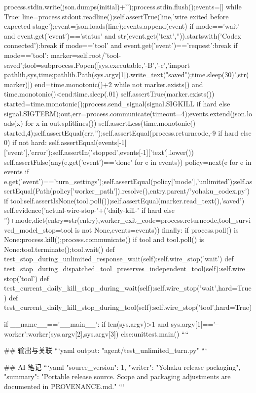    process.stdin.write(json.dumps(initial)+'\n');process.stdin.flush();events=[]
   while True:
    line=process.stdout.readline();self.assertTrue(line,'wire exited before expected stage');event=json.loads(line);events.append(event)
    if mode=='wait' and event.get('event')=='status' and str(event.get('text','')).startswith('Codex connected'):break
    if mode=='tool' and event.get('event')=='request':break
   if mode=='tool':
    marker=self.root/'tool-saved';tool=subprocess.Popen([sys.executable,'-B','-c','import pathlib,sys,time;pathlib.Path(sys.argv[1]).write_text("saved");time.sleep(30)',str(marker)])
    end=time.monotonic()+2
    while not marker.exists() and time.monotonic()<end:time.sleep(.01)
    self.assertTrue(marker.exists())
   started=time.monotonic();process.send_signal(signal.SIGKILL if hard else signal.SIGTERM);out,err=process.communicate(timeout=4);events.extend(json.loads(x) for x in out.splitlines())
   self.assertLess(time.monotonic()-started,4);self.assertEqual(err,'');self.assertEqual(process.returncode,-9 if hard else 0)
   if not hard:
    self.assertEqual(events[-1]['event'],'error');self.assertIn('stopped',events[-1]['text'].lower())
   self.assertFalse(any(e.get('event')=='done' for e in events))
   policy=next(e for e in events if e.get('event')=='turn_settings');self.assertEqual(policy['mode'],'unlimited');self.assertEqual(Path(policy['worker_path']).resolve(),entry.parent/'yohaku_codex.py')
   if tool:self.assertIsNone(tool.poll());self.assertEqual(marker.read_text(),'saved')
   self.evidence('actual-wire-stop-'+('daily-kill-' if hard else '')+mode,dict(entry=str(entry),worker_exit_code=process.returncode,tool_survived_model_stop=tool is not None,events=events))
  finally:
   if process.poll() is None:process.kill();process.communicate()
   if tool and tool.poll() is None:tool.terminate();tool.wait()
 def test_stop_during_unlimited_response_wait(self):self.wire_stop('wait')
 def test_stop_during_dispatched_tool_preserves_independent_tool(self):self.wire_stop('tool')
 def test_current_daily_kill_stop_during_wait(self):self.wire_stop('wait',hard=True)
 def test_current_daily_kill_stop_during_tool(self):self.wire_stop('tool',hard=True)

if __name__=='__main__':
 if len(sys.argv)>1 and sys.argv[1]=='--worker':worker(sys.argv[2],sys.argv[3])
 else:unittest.main()
````

## 输出与关联
```yaml
output: "agent/test_unlimited_turn.py"
```

## AI 笔记
```yaml
{"source_version": 1, "writer": "Yohaku release packaging", "summary": "Portable release source. Scope and packaging adjustments are documented in PROVENANCE.md."}
```
